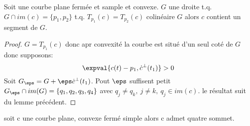			\begin{lemme} 
				Soit une courbe plane fermée et sample et convexe. $G$ une droite t.q. $G\cap im(c)=\{p_1,p_2\}$ t.q. $T_{p_1}(c)=T_{p_2}(c)$ colinéaire  $G$  alors $c$ contient un segment de $G$.
				\end{lemme} 
				\begin{proof}
					$G=T_{p_1}(c)$ donc apr convexité la courbe est situé d'un seul coté de $G$ donc supposons:
					$$\expval{c(t)-p_1,\dot c^\perp (t_1)}>0$$
					Soit $G_\eps =G+\eps\dot c^\perp(t_1)$. Pout $\eps$ suffisent petit $G_\eps\cap im(G)=\{q_1,q_2,q_3,q_4\}$ avec $q_j\neq q_k,\ j\neq k,\ q_j\in im(c)$. le résultat suit du lemme précédent.
				\end{proof}

				\begin{theorem}
					soit c une courbe plane, convexe fermé simple alors c admet quatre sommet.
				\end{theorem}
